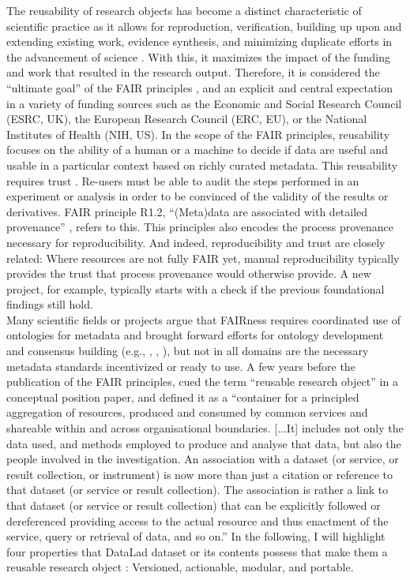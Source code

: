 The reusability of research objects has become a distinct characteristic of scientific practice as it allows for reproduction, verification, building up upon and extending existing work, evidence synthesis, and minimizing duplicate efforts in the advancement of science \citep{thanos2017research}.
With this, it maximizes the impact of the funding and work that resulted in the research output.
Therefore, it is considered the “ultimate goal” of the FAIR principles \citep{wilkinson2016fair}, and an explicit and central expectation in a variety of funding sources such as the Economic and Social Research Council (ESRC, UK), the European Research Council (ERC, EU), or the National Institutes of Health (NIH, US).
In the scope of the FAIR principles, reusability focuses on the ability of a human or a machine to decide if data are useful and usable in a particular context based on richly curated metadata.
This reusability requires trust \citep{bechhofer2010research}. Re-users must be able to audit the steps performed in an experiment or analysis in order to be convinced of the validity of the results or derivatives.
FAIR principle R1.2, ``(Meta)data are associated with detailed provenance'' \citep{wilkinson2016fair}, refers to this.
This principles also encodes the process provenance necessary for reproducibility.
And indeed, reproducibility and trust are closely related:
Where resources are not fully FAIR yet, manual reproducibility typically provides the trust that process provenance would otherwise provide.
A new project, for example, typically starts with a check if the previous foundational findings still hold.\\
Many scientific fields or projects argue that FAIRness requires coordinated use of ontologies for metadata and brought forward efforts for ontology development and consensus building (e.g., \citet{wise2019implementation}, \citet{abrams2022standards}, \citet{papadiamantis2020metadata}), but not in all domains are the necessary metadata standards incentivized or ready to use.
A few years before the publication of the FAIR principles, \citet{bechhofer2013linked} cued the term ``reusable research object'' in a conceptual position paper, and defined it as a ``container for a principled aggregation of resources, produced and consumed by common services and shareable within and across organisational boundaries. [...It] includes not only the data used, and methods employed to produce and analyse that data, but also the people involved in the investigation. An association with a dataset (or service, or result collection, or instrument) is now more than just a citation or reference to that dataset (or service or result collection). The association is rather a link to that dataset (or service or result collection) that can be explicitly followed or dereferenced providing access to the actual resource and thus enactment of the service, query or retrieval of data, and so on.''
In the following, I will highlight four properties that DataLad dataset or its contents possess that make them a reusable research object \citep{wagnerohbm2021}: Versioned, actionable, modular, and portable.


